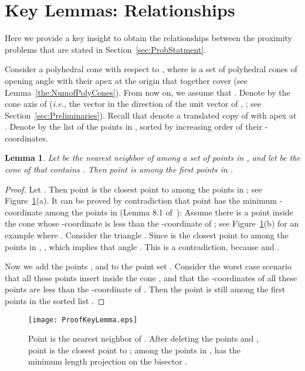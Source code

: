 \documentclass[preprint,12pt]{elsarticle}
\newcommand{\ie}{\emph{i.e.}}
\newtheorem{lemma}{Lemma}[section]
\begin{document}
\section{Key Lemmas: Relationships}\label{sec:Relationship}
Here we provide a key insight to obtain the relationships between the proximity problems that are stated in Section~\ref{sec:ProbStatment}.

Consider a polyhedral cone  with respect to , where   is a set of polyhedral cones of opening angle  with their apex at the origin  that together cover  (see Lemma~\ref{the:NumofPolyCones}). From now on, we assume that . Denote by  the cone axis of  (\ie, the vector in the direction of the unit vector  of , ; see Section~\ref{sec:Preliminaries}). Recall that  denote a translated copy of  with apex at . Denote by  the list of the points in , sorted by increasing order of their -coordinates.

\begin{lemma}\label{the:keyLemma2}
Let  be the  nearest neighbor of  among a set  of points in , and let  be the cone of  that contains . Then point  is among the first  points in .
\end{lemma}
\begin{proof}
Let . Then point  is the closest point to  among the points in ; see Figure~\ref{fig:ProofKeyLemma}(a). It can be proved by contradiction that point  has the minimum -coordinate among the points in  (Lemma 8.1 of~\cite{Agarwal:2008:KDD:1435375.1435379}): Assume there is a point  inside the cone  whose -coordinate is less than the -coordinate of ; see Figure~\ref{fig:ProofKeyLemma}(b) for an example where . Consider the triangle . Since  is the closest point to  among the points in , , which implies that angle . This is a contradiction, because  and .

Now we add the points , and   to the point set . Consider the worst case scenario that all these   points insert inside the cone , and that the -coordinates of all these points are less than the -coordinate of . Then the point  is still among the  first  points in the sorted list  .
\end{proof}

\begin{figure}[h]
\centering
\texttt{[image: ProofKeyLemma.eps]}
\caption{Point  is the  nearest neighbor of . After deleting the points  and , point  is the closest point to ; among the points in ,  has the minimum length projection on the bisector .}
\label{fig:ProofKeyLemma}
\end{figure}
\end{document}
